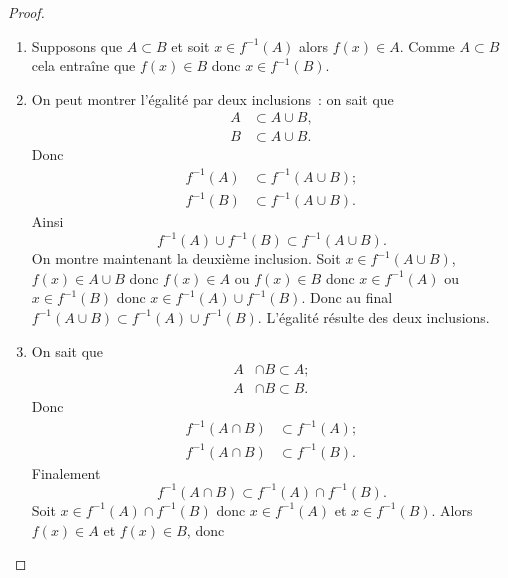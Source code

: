 \begin{proof}
    \begin{enumerate}
        \item Supposons que \(A \subset B\) et soit \(x \in f^{-1}(A)\) alors 
            \(f(x) \in A\). Comme \(A\subset B\) cela entraîne que \(f(x) \in 
            B\) donc \(x \in f^{-1}(B)\).
        \item On peut montrer l'égalité par deux inclusions~: on sait que
            \begin{align}
                A &\subset A \cup B, \\
                B &\subset A \cup B.
            \end{align}
            Donc
            \begin{align} 
                f^{-1}(A) &\subset f^{-1}(A \cup B); \\
                f^{-1}(B) &\subset f^{-1}(A \cup B).
            \end{align}
            Ainsi 
            \begin{equation}
                f^{-1}(A) \cup f^{-1}(B) \subset f^{-1}(A \cup B).
            \end{equation}
            On montre maintenant la deuxième inclusion. Soit \(x \in f^{-1}(A 
            \cup B)\), \(f(x) \in A \cup B\) donc \(f(x) \in A\) ou \(f(x) \in 
            B\) donc \(x \in f^{-1}(A)\) ou \(x \in f^{-1}(B)\) donc \(x \in 
            f^{-1}(A) \cup f^{-1}(B)\). Donc au final \(f^{-1}(A \cup B) \subset 
            f^{-1}(A) \cup f^{-1}(B)\). L'égalité résulte des deux inclusions.
        \item On sait que
            \begin{align}
                A & \cap B \subset A ;\\ 
                A & \cap B \subset B.
            \end{align}
            Donc
            \begin{align}
                f^{-1}(A \cap B) &\subset f^{-1}(A);\\ 
                f^{-1}(A \cap B) &\subset f^{-1}(B).
            \end{align}
            Finalement
            \begin{equation}
                f^{-1}(A \cap B) \subset f^{-1}(A) \cap f^{-1}(B).
            \end{equation}
            Soit \(x \in f^{-1}(A) \cap f^{-1}(B)\) donc \(x \in f^{-1}(A)\) et 
            \(x \in f^{-1}(B)\). Alors \(f(x) \in A\) et \(f(x) \in B\), donc 

\end{enumerate}
\end{proof}
